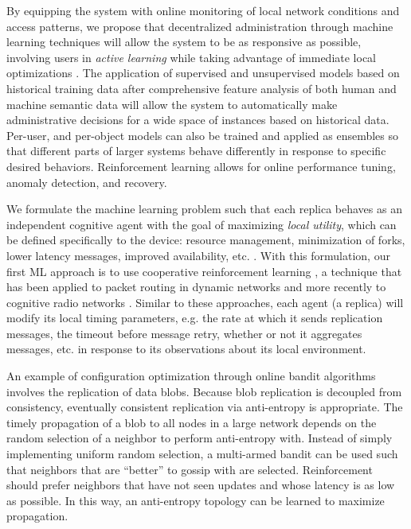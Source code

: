 \documentclass{article}
\begin{document}
By equipping the system with online monitoring of local network conditions and access patterns, we propose that decentralized administration through machine learning techniques will allow the system to be as responsive as possible, involving users in \emph{active learning} \cite{kalai_efficient_2005,osugi_balancing_2005} while taking advantage of immediate local optimizations \cite{oates_investigating_1998}. The application of supervised and unsupervised models based on historical training data after comprehensive feature analysis of both human and machine semantic data will allow the system to automatically make administrative decisions for a wide space of instances based on historical data. Per-user, and per-object models can also be trained and applied as ensembles so that different parts of larger systems behave differently in response to specific desired behaviors. Reinforcement learning allows for online performance tuning, anomaly detection, and recovery.

We formulate the machine learning problem such that each replica behaves as an independent cognitive agent with the goal of maximizing \emph{local utility}, which can be defined specifically to the device: resource management, minimization of forks, lower latency messages, improved availability, etc. \cite{oates_investigating_1998}. With this formulation, our first ML approach is to use cooperative reinforcement learning \cite{lauer_algorithm_2000,langford_epoch-greedy_2008}, a technique that has been applied to packet routing in dynamic networks \cite{boyan_packet_1994} and more recently to cognitive radio networks \cite{clancy_applications_2007}. Similar to these approaches, each agent (a replica) will modify its local timing parameters, e.g. the rate at which it sends replication messages, the timeout before message retry, whether or not it aggregates messages, etc. in response to its observations about its local environment.

An example of configuration optimization through online bandit algorithms \cite{bouneffouf_contextual_2014} involves the replication of data blobs. Because blob replication is decoupled from consistency, eventually consistent replication via anti-entropy is appropriate. The timely propagation of a blob to all nodes in a large network depends on the random selection of a neighbor to perform anti-entropy with. Instead of simply implementing uniform random selection, a multi-armed bandit can be used such that neighbors that are ``better'' to gossip with are selected. Reinforcement should prefer neighbors that have not seen updates and whose latency is as low as possible. In this way, an anti-entropy topology can be learned to maximize propagation.
\end{document}
